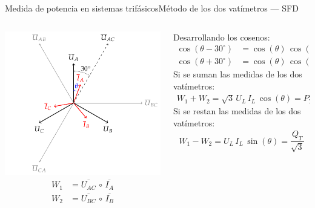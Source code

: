 \documentclass[aspectratio=169, xcolor={usenames,svgnames,dvipsnames}]{beamer}
\begin{document}
\begin{frame}{Medida de potencia en sistemas trifásicos}{Método de los dos vatímetros --- SFD}
\begin{columns}
\begin{column}{0.38\columnwidth}
	    \centering
	    \includegraphics[width=0.9\linewidth]{../figs/fasores_potencia3H.pdf}
	    \begin{align*}
	    W_1&=\overline{U_{AC}}\,\circ\,\overline{I_A}\\ 
	    W_2&=\overline{U_{BC}}\,\circ\,\overline{I_B}
	\end{align*}
\end{column}
\begin{column}{0.6\columnwidth}
Desarrollando los cosenos:
\begin{align*}
  \cos(\theta-{30^\circ}) &= \cos(\theta)\,\cos({30^\circ}) + \sin(\theta)\,\sin({30^\circ})\\
  \cos(\theta+{30^\circ}) &= \cos(\theta)\,\cos({30^\circ}) - \sin(\theta)\,\sin({30^\circ})
\end{align*}
Si se suman las medidas de los dos vatímetros:
\begin{align*}
     \boxed{W_1 + W_2 = \sqrt{3}\,U_L\, I_L\,\cos(\theta) = P_T}
\end{align*}
Si se restan las medidas de los dos vatímetros:
\begin{align*}
    \boxed{W_1 - W_2 = U_L\, I_L\,\sin(\theta) = \dfrac{Q_T}{\sqrt{3}}}
\end{align*}
\end{column}
\end{columns}
\end{frame}
\end{document}
